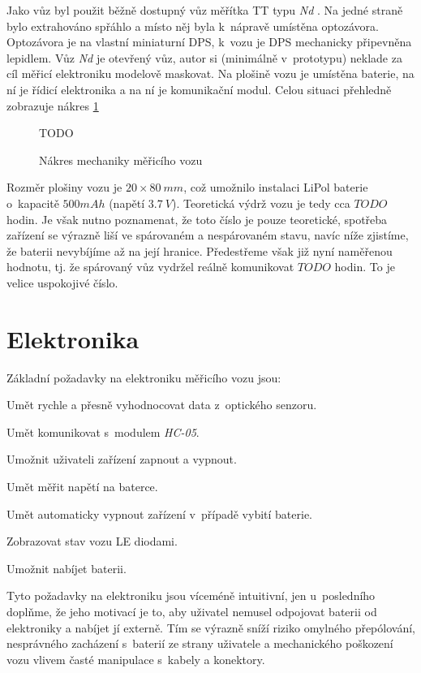 Jako vůz byl použit běžně dostupný vůz měřítka TT typu \textit{Nd}
\cite{vuz-nd}. Na jedné straně bylo extrahováno spřáhlo a místo něj byla
k~nápravě umístěna optozávora. Optozávora je na vlastní miniaturní DPS, k~vozu
je DPS mechanicky připevněna lepidlem. Vůz \textit{Nd} je otevřený vůz, autor si
(minimálně v~prototypu) neklade za cíl měřicí elektroniku modelově maskovat. Na
plošině vozu je umístěna baterie, na ní je řídicí elektronika a na ní je
komunikační modul. Celou situaci přehledně zobrazuje nákres
\ref{fig:vuz-nakres}

\begin{figure}[h]
TODO
\caption{Nákres mechaniky měřicího vozu}
\label{fig:vuz-nakres}
\end{figure}

Rozměr plošiny vozu je $20\times80\ mm$, což umožnilo instalaci LiPol baterie
o~kapacitě $500 mAh$ (napětí $3.7\ V$). Teoretická výdrž vozu je tedy cca $TODO$
hodin. Je však nutno poznamenat, že toto číslo je pouze teoretické, spotřeba
zařízení se výrazně liší ve spárovaném a nespárovaném stavu, navíc níže
zjistíme, že baterii nevybíjíme až na její hranice. Předestřeme však již nyní
naměřenou hodnotu, tj. že spárovaný vůz vydržel reálně komunikovat $TODO$ hodin.
To je velice uspokojivé číslo.

\section{Elektronika}
\label{sec:wsm-ele}

Základní požadavky na elektroniku měřicího vozu jsou:

\begin{compactenum}
\item Umět rychle a přesně vyhodnocovat data z~optického senzoru.
\item Umět komunikovat s~modulem \textit{HC-05}.
\item Umožnit uživateli zařízení zapnout a vypnout.
\item Umět měřit napětí na baterce.
\item Umět automaticky vypnout zařízení v~případě vybití baterie.
\item Zobrazovat stav vozu LE diodami.
\item Umožnit nabíjet baterii.
\end{compactenum}

Tyto požadavky na elektroniku jsou víceméně intuitivní, jen u~posledního
doplňme, že jeho motivací je to, aby uživatel nemusel odpojovat baterii od
elektroniky a nabíjet jí externě. Tím se výrazně sníží riziko omylného
přepólování, nesprávného zacházení s~baterií ze strany uživatele a mechanického
poškození vozu vlivem časté manipulace s~kabely a konektory.

